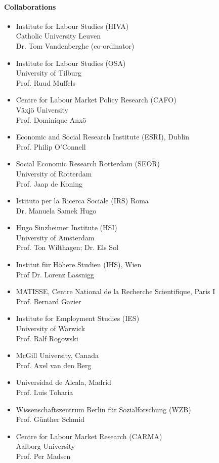 \newpage
\paragraph{Collaborations}
\begin{itemize}
\item Institute for Labour Studies (HIVA) \\ Catholic University Leuven \\ Dr. Tom Vandenberghe (co-ordinator)
\item Institute for Labour Studies (OSA) \\ University of Tilburg \\ Prof. Ruud Muffels 
\item Centre for Labour Market Policy Research (CAFO) \\ V\"axj\"o University \\ Prof. Dominique Anx\"o
\item Economic and Social Research Institute (ESRI), Dublin \\ Prof. Philip O'Connell 
\item Social Economic Research Rotterdam (SEOR) \\ University of Rotterdam \\ Prof. Jaap de Koning
\item Istituto per la Ricerca Sociale (IRS) Roma \\ Dr. Manuela Samek Hugo
\item Hugo Sinzheimer Institute (HSI) \\ University of Amsterdam \\ Prof. Ton Wilthagen; Dr. Els Sol
\item Institut f\"ur H\"ohere Studien (IHS), Wien \\ Prof Dr. Lorenz Lassnigg 
\item MATISSE, Centre National de la Recherche Scientifique, Paris I \\ Prof. Bernard Gazier
\item Institute for Employment Studies (IES) \\ University of Warwick \\ Prof. Ralf Rogowski 
\item McGill University, Canada \\ Prof. Axel van den Berg 
\item Universidad de Alcala, Madrid \\ Prof. Luis Toharia
\item Wissenschaftszentrum Berlin f\"ur Sozialforschung (WZB) \\ Prof. G\"unther Schmid 
\item Centre for Labour Market Research (CARMA) \\ Aalborg University \\ Prof. Per Madsen
\end{itemize}

